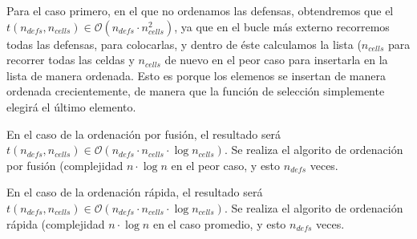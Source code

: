 Para el caso primero, en el que no ordenamos las defensas, obtendremos que el $t(n_{defs}, n_{cells}) \in \mathcal{O}(n_{defs} \cdot n_{cells}^{2})$, ya que en el bucle más externo recorremos todas las defensas, para colocarlas, y dentro de éste calculamos la lista ($n_{cells}$ para recorrer todas las celdas y $n_{cells}$ de nuevo en el peor caso para insertarla en la lista de manera ordenada. Esto es porque los elemenos se insertan de manera ordenada crecientemente, de manera que la función de selección simplemente elegirá el último elemento.

En el caso de la ordenación por fusión, el resultado será $t(n_{defs}, n_{cells}) \in \mathcal{O}(n_{defs} \cdot n_{cells} \cdot \log{n_{cells}})$. Se realiza el algorito de ordenación por fusión (complejidad $n \cdot \log{n}$ en el peor caso, y esto $n_{defs}$ veces.

En el caso de la ordenación rápida, el resultado será $t(n_{defs}, n_{cells}) \in \mathcal{O}(n_{defs} \cdot n_{cells} \cdot \log{n_{cells}})$. Se realiza el algorito de ordenación rápida (complejidad $n \cdot \log{n}$ en el caso promedio, y esto $n_{defs}$ veces.
